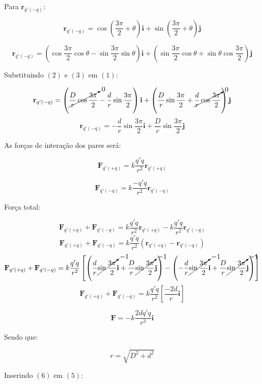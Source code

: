\documentclass[a4paper, 12pt]{article}
\begin{document}
	
	
	Para $\textbf{r}_{q'(-q)}$:
	
	\[
	\textbf{r}_{q'(-q)}=\cos{\left(\frac{3\pi}{2}+\theta\right)}\textbf{i}+\sin{\left(\frac{3\pi}{2}+\theta\right)}\textbf{j}
	\]
	
	\begin{equation}
		\textbf{r}_{q'(-q)}=\left(\cos\frac{3\pi}{2}\cos\theta-\sin\frac{3\pi}{2}\sin\theta\right)\textbf{i}+\left(\sin{\frac{3\pi}{2}}\cos{\theta}+\sin{\theta}\cos{\frac{3\pi}{2}}\right)\textbf{j}
	\end{equation}
	
	Substituindo $(2)$ e $(3)$ em $(1)$:
	
	\[
	\textbf{r}_{q'(-q)}=\left(\cancelto{0}{\frac{D}{r}\cos\frac{3\pi}{2}}-\frac{d}{r}\sin\frac{3\pi}{2}\right)\textbf{i}+\left(\frac{D}{r}\sin{\frac{3\pi}{2}}+\cancelto{0}{\frac{d}{r}\cos{\frac{3\pi}{2}}}\right)\textbf{j}
	\]
	\[
	\textbf{r}_{q'(-q)}=-\frac{d}{r}\sin\frac{3\pi}{2}\textbf{i}+\frac{D}{r}\sin{\frac{3\pi}{2}}\textbf{j}
	\]
	
	As forças de interação dos pares será:
	
	\[
	\textbf{F}_{q'(+q)}=k\frac{q'q}{r^2}\textbf{r}_{q'(+q)}
	\]
	
	\[
	\textbf{F}_{q'(-q)}=k\frac{-q'q}{r^2}\textbf{r}_{q'(-q)}
	\]
	
	Força total:
	
	\[
	\textbf{F}_{q'(+q)}+\textbf{F}_{q'(-q)}=k\frac{q'q}{r^2}\textbf{r}_{q'(+q)}-k\frac{q'q}{r^2}\textbf{r}_{q'(-q)}
	\]
	\[
	\textbf{F}_{q'(+q)}+\textbf{F}_{q'(-q)}=k\frac{q'q}{r^2}\left(\textbf{r}_{q'(+q)}-\textbf{r}_{q'(-q)}\right)
	\]
	\[
	\textbf{F}_{q'(+q)}+\textbf{F}_{q'(-q)}=k\frac{q'q}{r^2}\left[\left(\frac{d}{r}\cancelto{-1}{\sin\frac{3\pi}{2}}\textbf{i}+\frac{D}{r}\cancelto{-1}{\sin\frac{3\pi}{2}}\textbf{j}\right)-\left(-\frac{d}{r}\cancelto{-1}{\sin\frac{3\pi}{2}}\textbf{i}+\frac{D}{r}\cancelto{-1}{\sin\frac{3\pi}{2}}\textbf{j}\right)\right]
	\]
	\[
	\textbf{F}_{q'(+q)}+\textbf{F}_{q'(-q)}=k\frac{q'q}{r^2}\left[\frac{-2d}{r}\textbf{i}\right]
	\]
	
	\begin{equation}
		\textbf{F}=-k\frac{2dq'q}{r^3}\textbf{i}
	\end{equation}
	
	Sendo que:
	
	\begin{equation}
		r=\sqrt{D^2+d^2}
	\end{equation}
	
	Inserindo $(6)$ em $(5)$:
	
\end{document}
